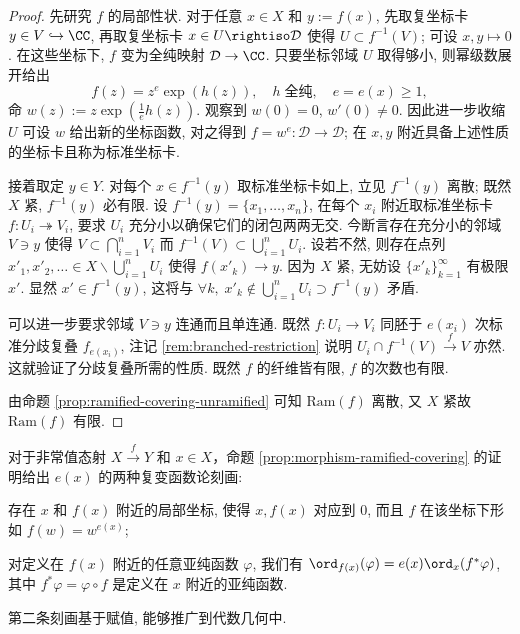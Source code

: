 \begin{proof}
	先研究 $f$ 的局部性状. 对于任意 $x \in X$ 和 $y := f(x)$, 先取复坐标卡 $y \in V \hookrightarrow \CC$, 再取复坐标卡 $x \in U \rightiso \mathcal{D}$ 使得 $U \subset f^{-1}(V)$; 可设 $x,y \mapsto 0$. 在这些坐标下, $f$ 变为全纯映射 $\mathcal{D} \to \CC$. 只要坐标邻域 $U$ 取得够小, 则幂级数展开给出
	\[ f(z) = z^e \exp(h(z)), \quad h \;\text{全纯}, \quad e = e(x) \geq 1, \]
	命 $w(z) := z\exp\left(\frac{1}{e} h(z)\right)$. 观察到 $w(0)=0$, $w'(0) \neq 0$. 因此进一步收缩 $U$ 可设 $w$ 给出新的坐标函数, 对之得到 $f = w^e: \mathcal{D} \to \mathcal{D}$; 在 $x,y$ 附近具备上述性质的坐标卡且称为标准坐标卡.

	接着取定 $y \in Y$. 对每个 $x \in f^{-1}(y)$ 取标准坐标卡如上, 立见 $f^{-1}(y)$ 离散; 既然 $X$ 紧, $f^{-1}(y)$ 必有限. 设 $f^{-1}(y) = \{x_1, \ldots, x_n \}$, 在每个 $x_i$ 附近取标准坐标卡 $f: U_i \twoheadrightarrow V_i$, 要求 $U_i$ 充分小以确保它们的闭包两两无交. 今断言存在充分小的邻域 $V \ni y$ 使得 $V \subset \bigcap_{i=1}^n V_i$ 而 $f^{-1}(V) \subset \bigcup_{i=1}^n U_i$. 设若不然, 则存在点列 $x'_1, x'_2, \ldots \in X \smallsetminus \bigcup_{i=1}^n U_i$ 使得 $f(x'_k) \to y$. 因为 $X$ 紧, 无妨设 $\{ x'_k \}_{k=1}^\infty$ 有极限 $x'$. 显然 $x' \in f^{-1}(y)$, 这将与 $\forall k, \; x'_k \notin \bigcup_{i=1}^n U_i \supset f^{-1}(y)$ 矛盾.
	
	可以进一步要求邻域 $V \ni y$ 连通而且单连通. 既然 $f: U_i \to V_i$ 同胚于 $e(x_i)$ 次标准分歧复叠 $f_{e(x_i)}$, 注记 \ref{rem:branched-restriction} 说明 $U_i \cap f^{-1}(V) \xrightarrow{f} V$ 亦然. 这就验证了分歧复叠所需的性质. 既然 $f$ 的纤维皆有限, $f$ 的次数也有限.

	由命题 \ref{prop:ramified-covering-unramified} 可知 $\text{Ram}(f)$ 离散, 又 $X$ 紧故 $\mathrm{Ram}(f)$ 有限.
\end{proof}

\begin{remark}\label{rem:ramification-index}
	对于非常值态射 $X \xrightarrow{f} Y$ 和 $x \in X$，命题 \ref{prop:morphism-ramified-covering} 的证明给出 $e(x)$ 的两种复变函数论刻画:
	\begin{compactitem}
		\item 存在 $x$ 和 $f(x)$ 附近的局部坐标, 使得 $x, f(x)$ 对应到 $0$, 而且 $f$ 在该坐标下形如 $f(w)=w^{e(x)}$;
		\item 对定义在 $f(x)$ 附近的任意亚纯函数 $\varphi$, 我们有 $\ord_{f(x)}(\varphi) = e(x) \ord_x(f^* \varphi)$, 其中 $f^* \varphi = \varphi \circ f$ 是定义在 $x$ 附近的亚纯函数.
	\end{compactitem}
	第二条刻画基于赋值, 能够推广到代数几何中.
\end{remark}

